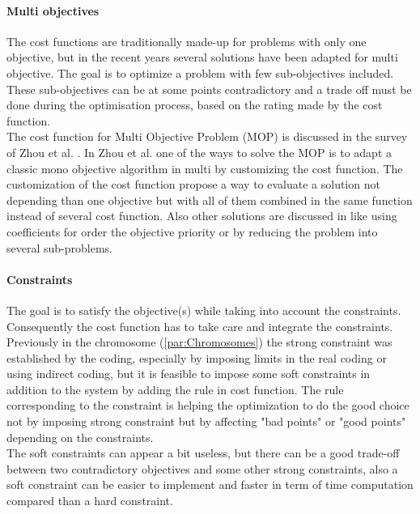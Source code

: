 \paragraph*{Multi objectives}
The cost functions are traditionally made-up for  problems with only one objective, but in the recent years several solutions have been adapted for multi objective. The goal is to optimize a problem with few sub-objectives included. These sub-objectives can be at some points contradictory and a trade off must be done during the optimisation process, based on the rating made by the cost function. \\
 The cost function for Multi Objective Problem (MOP) is discussed in the survey of Zhou et al. \cite{75*zhou2011}. In Zhou et al. \cite{75*zhou2011} one of the ways to solve the MOP is to adapt a classic mono objective algorithm in multi by customizing the cost function. The customization of the cost function propose a way to evaluate a solution not depending than one objective but with all of them combined in the same function instead of several cost function. 
 Also other solutions are discussed in \cite{75*zhou2011} like using coefficients for order the objective priority or by reducing the problem into several sub-problems. \\ %

\paragraph*{Constraints}
The goal is to satisfy the objective(s) while taking into account the constraints. Consequently the cost function has to take care and integrate the constraints. 
 Previously in the chromosome (\ref{par:Chromosomes}) the strong constraint was established by the coding, especially by imposing limits in the real coding or using indirect coding, but it is feasible to impose some soft constraints in addition to the system by adding the rule in cost function. The rule corresponding to the constraint is helping the optimization to do the good choice not by imposing strong constraint but by affecting "bad points" or "good points" depending on the constraints. \\
 The soft constraints can appear a bit useless, but there can be a good trade-off between two contradictory objectives and some other strong constraints, also a soft constraint can be easier to implement and faster in term of time computation compared than a hard constraint.  


